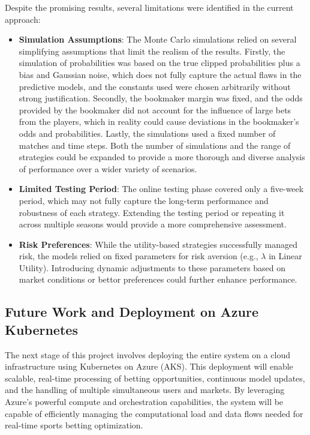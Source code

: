 Despite the promising results, several limitations were identified in the current approach:

\begin{itemize}
    \item \textbf{Simulation Assumptions}: The Monte Carlo simulations relied on several simplifying assumptions that limit the realism of the results. Firstly, the simulation of probabilities was based on the true clipped probabilities plus a bias and Gaussian noise, which does not fully capture the actual flaws in the predictive models, and the constants used were chosen arbitrarily without strong justification. Secondly, the bookmaker margin was fixed, and the odds provided by the bookmaker did not account for the influence of large bets from the players, which in reality could cause deviations in the bookmaker’s odds and probabilities. Lastly, the simulations used a fixed number of matches and time steps. Both the number of simulations and the range of strategies could be expanded to provide a more thorough and diverse analysis of performance over a wider variety of scenarios.
    \item \textbf{Limited Testing Period}: The online testing phase covered only a five-week period, which may not fully capture the long-term performance and robustness of each strategy. Extending the testing period or repeating it across multiple seasons would provide a more comprehensive assessment.
    \item \textbf{Risk Preferences}: While the utility-based strategies successfully managed risk, the models relied on fixed parameters for risk aversion (e.g., \( \lambda \) in Linear Utility). Introducing dynamic adjustments to these parameters based on market conditions or bettor preferences could further enhance performance.
\end{itemize}

\subsection{Future Work and Deployment on Azure Kubernetes}

The next stage of this project involves deploying the entire system on a cloud infrastructure using Kubernetes on Azure (AKS). This deployment will enable scalable, real-time processing of betting opportunities, continuous model updates, and the handling of multiple simultaneous users and markets. By leveraging Azure’s powerful compute and orchestration capabilities, the system will be capable of efficiently managing the computational load and data flows needed for real-time sports betting optimization.

